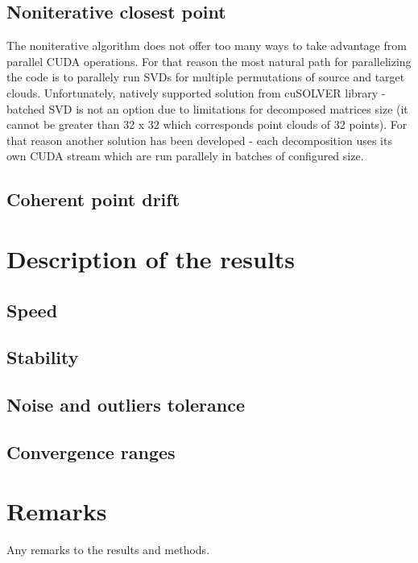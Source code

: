 \documentclass[titlepage]{article}
\begin{document}
\subsection{Noniterative closest point}
The noniterative algorithm does not offer too many ways to take advantage from parallel CUDA operations. For that reason the most natural path for parallelizing the code is to parallely run SVDs for multiple permutations of source and target clouds. Unfortunately, natively supported solution from cuSOLVER library - batched SVD is not an option due to limitations for decomposed matrices size (it cannot be greater than 32 x 32 which corresponds point clouds of 32 points). For that reason another solution has been developed - each decomposition uses its own CUDA stream which are run parallely in batches of configured size.\\

\subsection{Coherent point drift}


\section{Description of the results}

\subsection{Speed}

\subsection{Stability}

\subsection{Noise and outliers tolerance}

\subsection{Convergence ranges}

\section{Remarks}
Any remarks to the results and methods.
\end{document}
